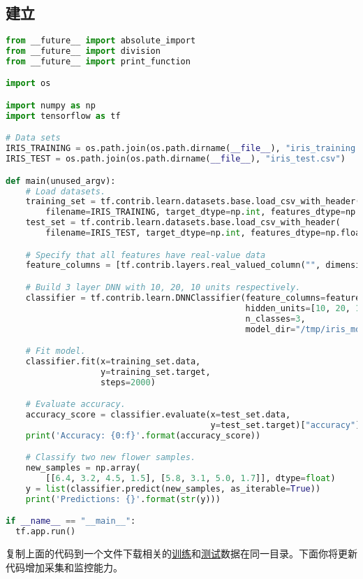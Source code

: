 \subsection{建立}
\begin{lstlisting}[language=Python]
from __future__ import absolute_import
from __future__ import division
from __future__ import print_function

import os

import numpy as np
import tensorflow as tf

# Data sets
IRIS_TRAINING = os.path.join(os.path.dirname(__file__), "iris_training.csv")
IRIS_TEST = os.path.join(os.path.dirname(__file__), "iris_test.csv")

def main(unused_argv):
    # Load datasets.
    training_set = tf.contrib.learn.datasets.base.load_csv_with_header(
        filename=IRIS_TRAINING, target_dtype=np.int, features_dtype=np.float32)
    test_set = tf.contrib.learn.datasets.base.load_csv_with_header(
        filename=IRIS_TEST, target_dtype=np.int, features_dtype=np.float32)

    # Specify that all features have real-value data
    feature_columns = [tf.contrib.layers.real_valued_column("", dimension=4)]

    # Build 3 layer DNN with 10, 20, 10 units respectively.
    classifier = tf.contrib.learn.DNNClassifier(feature_columns=feature_columns,
                                                hidden_units=[10, 20, 10],
                                                n_classes=3,
                                                model_dir="/tmp/iris_model")

    # Fit model.
    classifier.fit(x=training_set.data,
                   y=training_set.target,
                   steps=2000)

    # Evaluate accuracy.
    accuracy_score = classifier.evaluate(x=test_set.data,
                                         y=test_set.target)["accuracy"]
    print('Accuracy: {0:f}'.format(accuracy_score))

    # Classify two new flower samples.
    new_samples = np.array(
        [[6.4, 3.2, 4.5, 1.5], [5.8, 3.1, 5.0, 1.7]], dtype=float)
    y = list(classifier.predict(new_samples, as_iterable=True))
    print('Predictions: {}'.format(str(y)))

if __name__ == "__main__":
  tf.app.run()
\end{lstlisting}
复制上面的代码到一个文件下载相关的\href{http://download.tensorflow.org/data/iris_training.csv}{训练}和\href{http://download.tensorflow.org/data/iris_test.csv}{测试}数据在同一目录。下面你将更新代码增加采集和监控能力。
